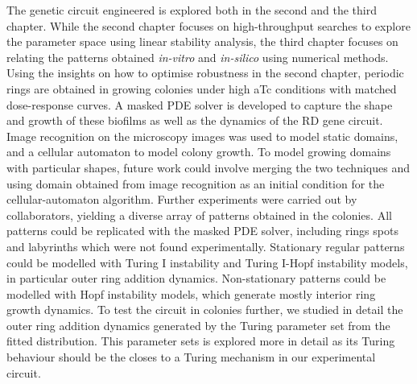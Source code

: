 The genetic circuit engineered is explored both in the second and the third chapter.
While the second chapter focuses on high-throughput searches to explore the parameter space using linear stability analysis, the third chapter focuses on relating the patterns obtained \textit{in-vitro} and \textit{in-silico} using numerical methods.
Using the insights on how to optimise robustness in the second chapter, periodic rings are obtained in growing colonies under high aTc conditions with matched dose-response curves.
A masked PDE solver is developed to capture the shape and growth of these biofilms as well as the dynamics of the RD gene circuit.
Image recognition on the microscopy images was used to model static domains, and a cellular automaton to model colony growth.
To model growing domains with particular shapes, future work could involve merging the two techniques and using domain obtained from image recognition as an initial condition for the cellular-automaton algorithm.
Further experiments were carried out by collaborators, yielding a diverse array of patterns obtained in the colonies.
All patterns could be replicated with the masked PDE solver, including rings spots and labyrinths which were not found experimentally.
Stationary regular patterns could be modelled with Turing I instability and Turing I-Hopf instability models, in particular outer ring addition dynamics.
Non-stationary patterns could be modelled with Hopf instability models, which generate mostly interior ring growth dynamics.
To test the circuit in colonies further, we studied in detail the outer ring addition dynamics generated by the Turing parameter set from the fitted distribution.
This parameter sets is explored more in detail as its Turing behaviour should be the closes to a Turing mechanism in our experimental circuit.






